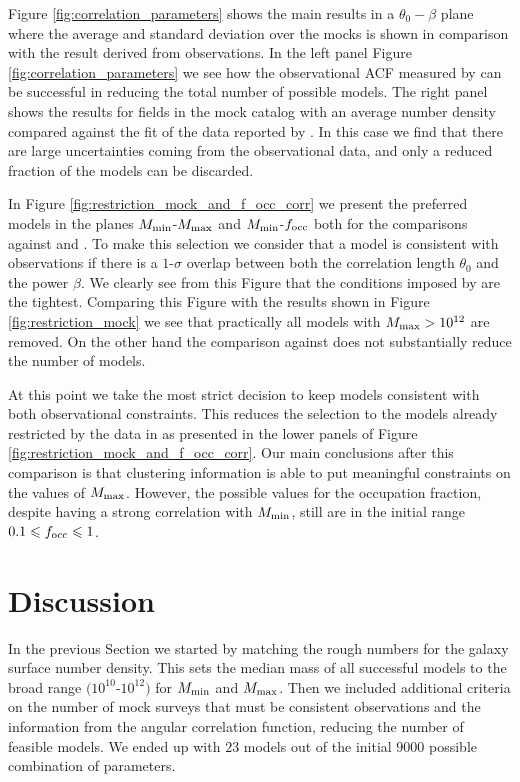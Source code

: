 \documentclass[usenatbib]{mn2e}
\newcommand{\hMsun}{{\ifmmode{h^{-1}{\rm
        {M_{\odot}}}}\else{$h^{-1}{\rm{M_{\odot}}}$}\fi}}
\begin{document}
Figure \ref{fig:correlation_parameters} shows the main results in a
$\theta_{0}-\beta$  plane where the average and standard deviation
over the mocks is shown in comparison with the result derived from
observations. In the left panel Figure \ref{fig:correlation_parameters} we see
how the observational ACF measured by \cite{Hayashino2004} 
can be successful in reducing the total number of possible models. The
right panel shows the results for fields in the mock catalog with an
average number density compared against the fit of the data
reported by \cite{Ouchi2010}. In this case we find that there are
large uncertainties coming from the observational data, and only a reduced
fraction of the models can be discarded.


In Figure \ref{fig:restriction_mock_and_f_occ_corr} we present the preferred
models in the planes $M_{\rm min}$-$M_{\rm  max}$ and $M_{\rm min}$-$f_{\rm occ}$
both for the comparisons against \cite{Hayashino2004} and
\cite{Ouchi2010}. To make this selection we consider that
a model is consistent with observations if there is a $1$-$\sigma$
overlap between both the correlation length $\theta_0$ and the power
$\beta$. We clearly see from this Figure that the conditions imposed
by \cite{Hayashino2004} are the tightest. Comparing this Figure with
the results shown in Figure \ref{fig:restriction_mock} we see that
practically all models with $M_{\rm max}>10^{12}$ are removed. On the
other hand the comparison against \cite{Ouchi2010} does not
substantially reduce the number of models. 

At this point we take the most strict decision to keep 
models consistent with both observational constraints. This
reduces the selection to the models already restricted by
the data in \cite{Hayashino2004} as presented in the lower panels of Figure
\ref{fig:restriction_mock_and_f_occ_corr}. Our main conclusions after
this comparison is that clustering information is able to put
meaningful constraints on the values of $M_{\rm max}$. However, the
possible values for the occupation fraction, despite having a strong correlation
with $M_{\rm min}$, still are in the initial range $0.1\leq f_{\rm
  occ}\leq 1$. 

\section{Discussion}

In the previous Section we started by matching the rough numbers for the
galaxy surface number density. This sets the median mass of all
successful models to the broad range $(10^{10}$-$10^{12})$ \hMsun for
$M_{\rm min}$ and $M_{\rm max}$. Then we included additional criteria on the
number of mock surveys that must be consistent observations
and the information from the angular correlation function, reducing
the number of feasible models. We ended up with $23$ models out of
the initial $9000$ possible combination of parameters. 
\end{document}

